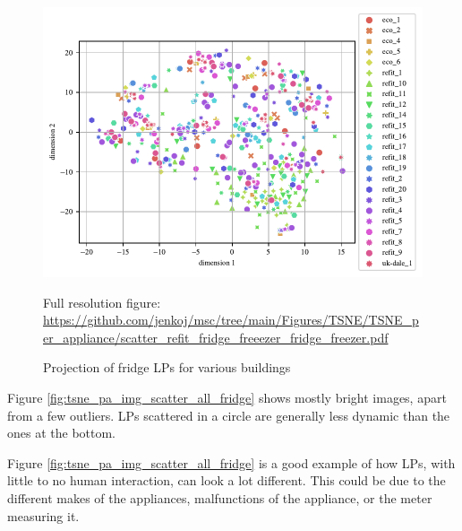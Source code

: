 \begin{figure}[H]
	\centering
	\caption{Projection of fridge LPs for various buildings}
	\includegraphics[]{Figures/TSNE/TSNE_per_appliance/scatter_refit_fridge_freeezer_fridge_freezer.pdf}
	\label{fig:tsne_pa_scatter_all_fridge}
	\par
	\par\footnotesize{Full resolution figure: \url{https://github.com/jenkoj/msc/tree/main/Figures/TSNE/TSNE_per_appliance/scatter_refit_fridge_freeezer_fridge_freezer.pdf}}
\end{figure}

Figure \ref{fig:tsne_pa_img_scatter_all_fridge} shows mostly bright images, apart from a few outliers.
LPs scattered in a circle are generally less dynamic than the ones at the bottom.

Figure \ref{fig:tsne_pa_img_scatter_all_fridge} is a good example of how LPs, with little to no human interaction, can look a lot different.
This could be due to the different makes of the appliances, malfunctions of the appliance, or the meter measuring it.

